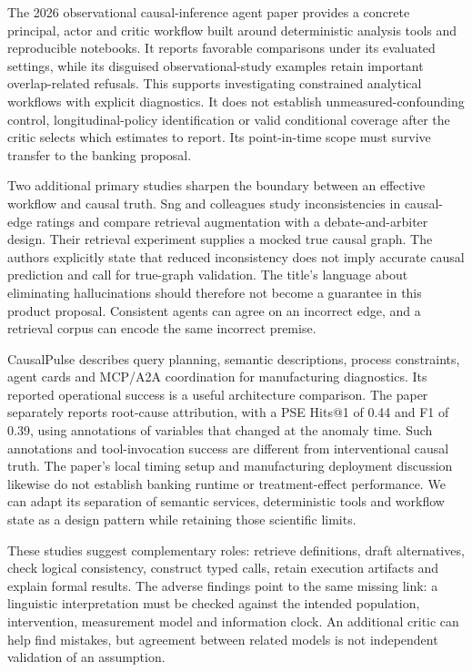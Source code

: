 The 2026 observational causal-inference agent paper provides a concrete
principal, actor and critic workflow built around deterministic analysis
tools and reproducible notebooks. It reports favorable comparisons under
its evaluated settings, while its disguised observational-study examples
retain important overlap-related refusals. This supports investigating
constrained analytical workflows with explicit diagnostics. It does not
establish unmeasured-confounding control, longitudinal-policy
identification or valid conditional coverage after the critic selects
which estimates to report. Its point-in-time scope must survive transfer
to the banking proposal. \citep{v12_la_2607_22443}

Two additional primary studies sharpen the boundary between an effective
workflow and causal truth. Sng and colleagues study inconsistencies in
causal-edge ratings and compare retrieval augmentation with a
debate-and-arbiter design. Their retrieval experiment supplies a mocked
true causal graph. The authors explicitly state that reduced
inconsistency does not imply accurate causal prediction and call for
true-graph validation. The title's language about eliminating
hallucinations should therefore not become a guarantee in this product
proposal. Consistent agents can agree on an incorrect edge, and a
retrieval corpus can encode the same incorrect premise.
\citep{exec13_hallucination}

CausalPulse describes query planning, semantic descriptions, process
constraints, agent cards and MCP/A2A coordination for manufacturing
diagnostics. Its reported operational success is a useful architecture
comparison. The paper separately reports root-cause attribution, with a
PSE Hits@1 of 0.44 and F1 of 0.39, using annotations of variables that
changed at the anomaly time. Such annotations and tool-invocation
success are different from interventional causal truth. The paper's
local timing setup and manufacturing deployment discussion likewise do
not establish banking runtime or treatment-effect performance. We can
adapt its separation of semantic services, deterministic tools and
workflow state as a design pattern while retaining those scientific
limits. \citep{exec13_pulse}

These studies suggest complementary roles: retrieve definitions, draft
alternatives, check logical consistency, construct typed calls, retain
execution artifacts and explain formal results. The adverse findings
point to the same missing link: a linguistic interpretation must be
checked against the intended population, intervention, measurement model
and information clock. An additional critic can help find mistakes, but
agreement between related models is not independent validation of an
assumption.

